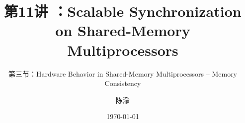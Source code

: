 


\title[第11讲]{第11讲 ：Scalable Synchronization on Shared-Memory Multiprocessors} %
\subtitle{第三节：Hardware Behavior in Shared-Memory Multiprocessors -- Memory Consistency}
\author{陈渝} %
\date{\today} %




\begin{frame}
\titlepage %
\end{frame}

